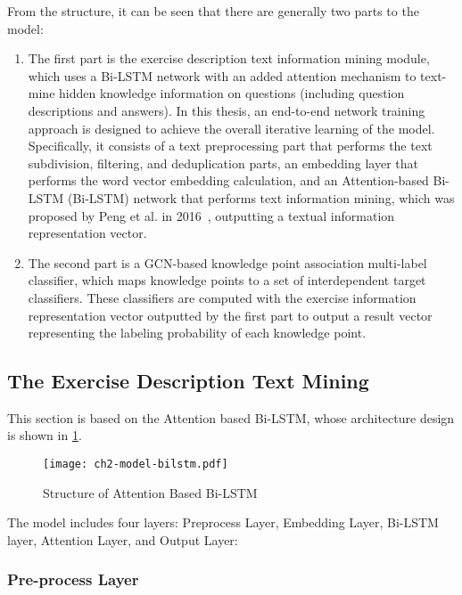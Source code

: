 From the structure, it can be seen that there are generally two parts to the model:
\begin{enumerate}
	\item The first part is the exercise description text information mining module, which uses a Bi-LSTM network with an added attention mechanism to text-mine hidden knowledge information on questions (including question descriptions and answers). In this thesis, an end-to-end network training approach is designed to achieve the overall iterative learning of the model. Specifically, it consists of a text preprocessing part that performs the text subdivision, filtering, and deduplication parts, an embedding layer that performs the word vector embedding calculation, and an Attention-based Bi-LSTM (Bi-LSTM) network that performs text information mining, which was proposed by Peng et al. in 2016~\cite{zhou2016attention}, outputting a textual information representation vector.
	\item The second part is a GCN-based knowledge point association multi-label classifier, which maps knowledge points to a set of interdependent target classifiers. These classifiers are computed with the exercise information representation vector outputted by the first part to output a result vector representing the labeling probability of each knowledge point.
\end{enumerate}


\subsection{The Exercise Description Text Mining}
This section is based on the Attention based Bi-LSTM, whose architecture design is shown in \figurename{\ref{fig:ch2-model-bilstm}}.
\begin{figure}[htbp!]
	\centering
	\texttt{[image: ch2-model-bilstm.pdf]}
	\caption{Structure of Attention Based Bi-LSTM}\label{fig:ch2-model-bilstm}
\end{figure}

The model includes four layers: Preprocess Layer, Embedding Layer, Bi-LSTM layer, Attention Layer, and Output Layer:
\subsubsection{Pre-process Layer}


